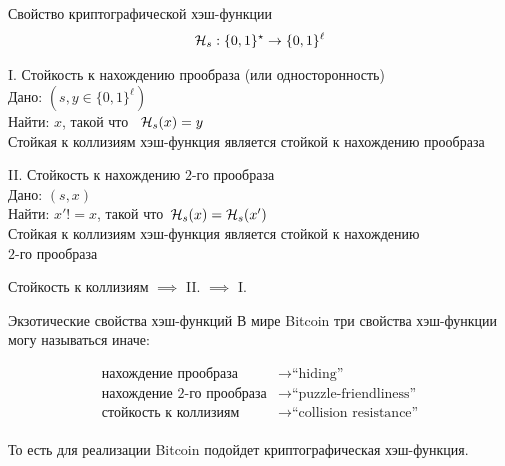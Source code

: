 \documentclass[usenames,dvipsnames,8pt,aspectratio=169]{beamer}
\begin{document}
\begin{frame}{Свойство криптографической хэш-функции}
\Large 
\[
\mathcal{H}_s: \{0,1\}^\star \rightarrow \{0,1\}^\ell
\]

{\color{Orange} I.} Стойкость к нахождению прообраза (или односторонность) \\[5pt]
Дано: $(s, y \in \{0,1\}^\ell)$\\
Найти: $x$, такой что \ $\mathcal{H}_s(x) =  y$ \\[5pt]
{\color{Orange} Стойкая к коллизиям хэш-функция является стойкой к нахождению прообраза}


\vspace{20pt}
{\color{Orange} II.} Стойкость к нахождению $2$-го прообраза \\[5pt]
Дано: $(s, x)$\\
Найти: $x'!=x$, такой что\ $\mathcal{H}_s(x) =  \mathcal{H}_s(x')$ \\[5pt]
{\color{Orange}  Стойкая к коллизиям хэш-функция является стойкой к нахождению \\ $2$-го прообраза}

\vspace{20pt}

Стойкость к коллизиям  $\implies$ 	{\color{Orange} II.}  $\implies$ 	{\color{Orange} I.}  
\end{frame}

\begin{frame}{Экзотические свойства хэш-функций}
\LARGE
В мире Bitcoin три свойства хэш-функции могу называться иначе:

\begin{align*}
\text{нахождение прообраза} & \rightarrow  \text{``hiding''} \\
\text{нахождение 2-го прообраза} & \rightarrow  \text{``puzzle-friendliness''} \\
\text{стойкость к коллизиям} & \rightarrow  \text{``collision resistance''} \\
\end{align*}


То есть для реализации Bitcoin подойдет криптографическая хэш-функция.

\end{frame}
\end{document}
